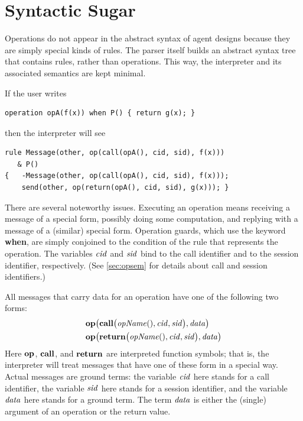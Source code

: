 \documentclass[a4paper,12pt,oneside,fleqn]{book} %
\begin{document}
\section{Syntactic Sugar}\label{sec:sugar} %

Operations do not appear in the abstract syntax of agent designs because
they are simply special kinds of rules. The parser itself builds an
abstract syntax tree that contains rules, rather than operations. This way,
the interpreter and its associated semantics are kept minimal.

\begin{example}
If the user writes
\begin{verbatim}
operation opA(f(x)) when P() { return g(x); }
\end{verbatim}
then the interpreter will see
\begin{verbatim}
rule Message(other, op(call(opA(), cid, sid), f(x)))
   & P()
{   -Message(other, op(call(opA(), cid, sid), f(x)));
    send(other, op(return(opA(), cid, sid), g(x))); }
\end{verbatim}
There are several noteworthy issues. Executing an operation means receiving
a message of a special form, possibly doing some computation, and replying
with a message of a (similar) special form. Operation guards, which use the
keyword {\bf when}, are simply conjoined to the condition of the rule that
represents the operation. The variables ${\it cid}$ and ${\it sid}$ bind to
the call identifier and to the session identifier, respectively. (See
\autoref{sec:opsem} for details about call and session identifiers.)
\end{example}

All messages that carry data for an operation have one of the following two
forms:
\begin{align}
  &{\bf op}\bigl(
    {\bf call}\bigl({\it opName}(), {\it cid}, {\it sid}\bigr),
    {\it data}
  \bigr)
\\
  &{\bf op}\bigl(
    {\bf return}\bigl({\it opName}(), {\it cid}, {\it sid}\bigr),
    {\it data}
  \bigr)
\end{align}
Here ${\bf op}$, $\bf call$, and $\bf return$ are interpreted function
symbols; that is, the interpreter will treat messages that have one of
these form in a special way. Actual messages are ground terms: the variable
$\it cid$ here stands for a call identifier, the variable $\it sid$ here
stands for a session identifier, and the variable $\it data$ here stands
for a ground term. The term $\it data$ is either the (single) argument of
an operation or the return value.
\end{document}
